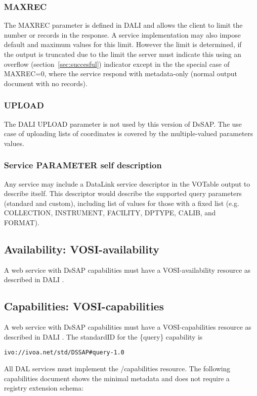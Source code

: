 \documentclass[11pt,a4paper]{ivoa}
\begin{document}
\subsubsection{MAXREC}
The MAXREC parameter is defined in DALI and allows the client to limit the number or records in the response. A service implementation may also impose default and maximum values for this limit. However the limit is determined, if the output is truncated due to the limit the server must indicate this using an overflow  (section~\ref{sec:succesful}) indicator except in the the special case of MAXREC=0, where the  service respond with metadata-only (normal output document with no records).

\subsubsection{UPLOAD}
 The DALI UPLOAD parameter is not used by this version of DsSAP. The use case of uploading lists of coordinates is covered by the multiple-valued parameters values.

\subsubsection{Service PARAMETER self description}
Any service may  include a DataLink service descriptor in the VOTable output to describe itself. This descriptor would describe the supported query parameters (standard and custom), including list of values for those with a fixed list (e.g. COLLECTION, INSTRUMENT, FACILITY, DPTYPE, CALIB, and FORMAT).

\subsection{Availability: VOSI-availability}
A web service with DsSAP capabilities must have a VOSI-availability resource \citep{std:VOSI}  as described in DALI .
\subsection{Capabilities: VOSI-capabilities}
A web service with DsSAP capabilities must have a VOSI-capabilities resource \citep{std:VOSI} as described in DALI . The standardID for the \{query\} capability is 

\begin{lstlisting}
ivo://ivoa.net/std/DSSAP#query-1.0
\end{lstlisting}

All DAL services must implement the /capabilities resource. The following capabilities document shows the minimal metadata and does not require a registry extension schema:
\end{document}
